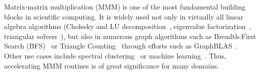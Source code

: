 \documentclass[sigplan,review,anonymous]{acmart}\settopmatter{printfolios=true,printccs=false,printacmref=false}
\begin{document}
%
Matrix-matrix multiplication (MMM) is one of the most fundamental building
blocks in scientific computing. It is widely used not only in virtually all
linear algebra algorithms (Cholesky and LU
decomposition~\cite{meyer2000matrix}, eigenvalue
factorization~\cite{chatelin2012eigenvalues}, triangular
solvers~\cite{linearAlgebraLAPACK}), but also in numerous graph algorithms such
as Breadth-First Search (BFS)~\cite{cormen2009introduction} or Triangle
Counting~\cite{azad2015parallel} through efforts such as
GraphBLAS~\cite{kepner2016mathematical}. Other use cases include spectral
clustering~\cite{ng2002spectral} or machine
learning~\cite{abadi2016tensorflow}.  Thus, accelerating MMM routines is of
great significance for many domains.
\end{document}

